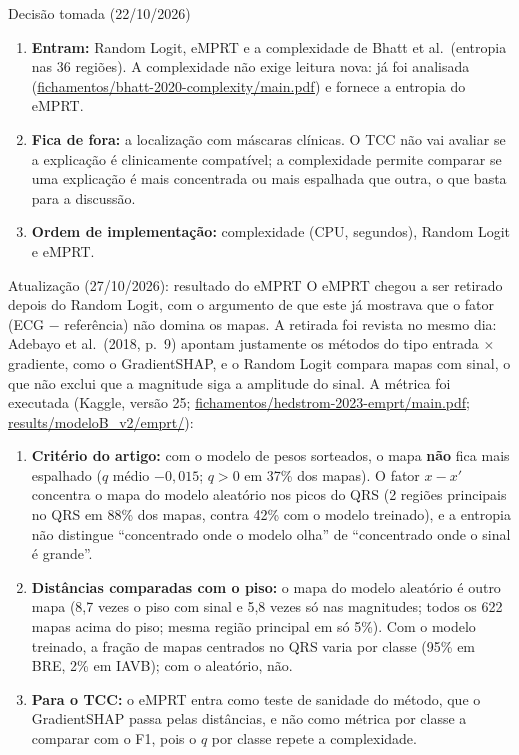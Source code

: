 \documentclass[11pt,a4paper]{article}
\begin{document}
\begin{infobox}[ok]{Decisão tomada (22/10/2026)}
\begin{enumerate}
\item \textbf{Entram:} Random Logit, eMPRT e a complexidade de Bhatt et al.\ (entropia nas 36 regiões). A complexidade não exige leitura nova: já foi analisada (\url{fichamentos/bhatt-2020-complexity/main.pdf}) e fornece a entropia do eMPRT.
\item \textbf{Fica de fora:} a localização com máscaras clínicas. O TCC não vai avaliar se a explicação é clinicamente compatível; a complexidade permite comparar se uma explicação é mais concentrada ou mais espalhada que outra, o que basta para a discussão.
\item \textbf{Ordem de implementação:} complexidade (CPU, segundos), Random Logit e eMPRT.
\end{enumerate}
\end{infobox}

\begin{infobox}[warn]{Atualização (27/10/2026): resultado do eMPRT}
O eMPRT chegou a ser retirado depois do Random Logit, com o argumento de que este já mostrava que o fator (ECG $-$ referência) não domina os mapas. A retirada foi revista no mesmo dia: Adebayo et al.\ (2018, p.~9) apontam justamente os métodos do tipo entrada $\times$ gradiente, como o GradientSHAP, e o Random Logit compara mapas com sinal, o que não exclui que a magnitude siga a amplitude do sinal. A métrica foi executada (Kaggle, versão 25; \url{fichamentos/hedstrom-2023-emprt/main.pdf}; \url{results/modeloB_v2/emprt/}):
\begin{enumerate}
\item \textbf{Critério do artigo:} com o modelo de pesos sorteados, o mapa \textbf{não} fica mais espalhado ($q$ médio $-0{,}015$; $q > 0$ em 37\% dos mapas). O fator $x - x'$ concentra o mapa do modelo aleatório nos picos do QRS (2 regiões principais no QRS em 88\% dos mapas, contra 42\% com o modelo treinado), e a entropia não distingue “concentrado onde o modelo olha” de “concentrado onde o sinal é grande”.
\item \textbf{Distâncias comparadas com o piso:} o mapa do modelo aleatório é outro mapa (8,7 vezes o piso com sinal e 5,8 vezes só nas magnitudes; todos os 622 mapas acima do piso; mesma região principal em só 5\%). Com o modelo treinado, a fração de mapas centrados no QRS varia por classe (95\% em BRE, 2\% em IAVB); com o aleatório, não.
\item \textbf{Para o TCC:} o eMPRT entra como teste de sanidade do método, que o GradientSHAP passa pelas distâncias, e não como métrica por classe a comparar com o F1, pois o $q$ por classe repete a complexidade.
\end{enumerate}
\end{infobox}
\end{document}

